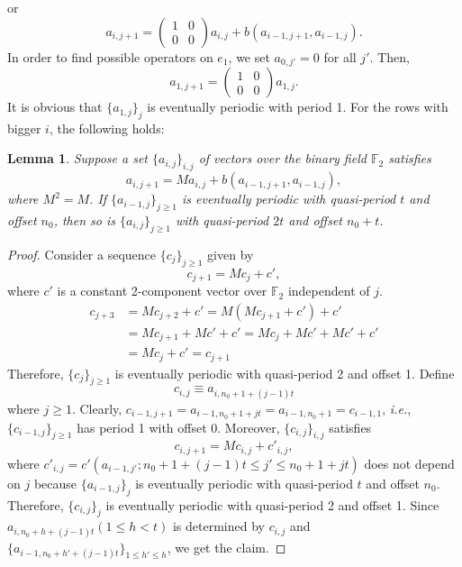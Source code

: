 \documentclass[letterpaper,10pt,pra,aps,showpacs,twocolumn]{revtex4-1}
\newtheorem{lem}{Lemma}
\theoremstyle{definition} \newtheorem{defn}{Definition}
\theoremstyle{definition} \newtheorem{remark}{Remark}
\newcommand{\ie}{\emph{i.e.}}
\begin{document}
or
\begin{equation}
 a_{i,j+1} = \begin{pmatrix} 1 & 0 \\ 0 & 0 \end{pmatrix} a_{i,j} + b( a_{i-1,j+1} , a_{i-1,j} ).
\label{eq:code-2-Rx-recursive}
\end{equation}
In order to find possible operators on $e_1$, we set $a_{0,j'}= 0$ for all $j'$. Then,
\[
 a_{1,j+1} = \begin{pmatrix} 1 & 0 \\ 0 & 0 \end{pmatrix} a_{1,j}.
\]
It is obvious that $\{ a_{1,j} \}_j$ is eventually periodic with period 1. For the rows with bigger $i$, the following holds:
\begin{lem}
Suppose a set $\{ a_{i,j} \}_{i,j}$ of vectors over the binary field $\mathbb{F}_2$ satisfies
\[
 a_{i,j+1} = M a_{i,j} + b( a_{i-1,j+1} , a_{i-1,j} ),
\]
where $M^2 = M$. If $\{ a_{i-1,j} \}_{j \geq 1}$ is eventually periodic with quasi-period $t$ and offset $n_0$, then so is $\{ a_{i,j} \}_{j \geq 1}$ with quasi-period $2t$ and offset $n_0 + t$.
\label{lem:doubling-quasi-period}
\end{lem}
\begin{proof}
Consider a sequence $\{ c_j \}_{j \geq 1}$ given by
\[
 c_{j+1} = M c_j + c' ,
\]
where $c'$ is a constant 2-component vector over $\mathbb{F}_2$ independent of $j$.
\begin{align*}
 c_{j+3}
&= M c_{j+2} + c' = M (M c_{j+1} +c') + c'\\
&= M c_{j+1} + M c' + c' = M c_j + M c' + M c' + c' \\
&= M c_j + c' = c_{j+1}
\end{align*}
Therefore, $\{ c_j \}_{j \geq 1}$ is eventually periodic with quasi-period 2 and offset 1.
Define
\[
 c_{i,j} \equiv a_{i, n_0+1+(j-1)t}
\]
where $j \geq 1$.
Clearly, $c_{i-1,j+1} = a_{i-1, n_0+1+jt} = a_{i-1,n_0+1} = c_{i-1,1}$, \ie, $\{ c_{i-1,j} \}_{j \geq 1} $ has period 1 with offset 0. Moreover, $\{ c_{i,j} \} _{i,j} $ satisfies
\[
 c_{i,j+1} = M c_{i,j} + c'_{i,j},
\]
where $c'_{i,j}=c'( a_{i-1,j'} ; n_0+1+(j-1)t \leq j' \leq n_0 + 1 + j t )$ does not depend on $j$ because $\{ a_{i-1,j} \}_j$ is eventually periodic with quasi-period $t$ and offset $n_0$. Therefore, $\{ c_{i,j} \}_j$ is eventually periodic with quasi-period 2 and offset 1. Since $a_{i,n_0+h+(j-1)t} (1 \leq h < t)$ is determined by $c_{i,j}$ and $\{ a_{i-1,n_0+h'+(j-1)t} \}_{1 \leq h' \leq h}$, we get the claim.
\end{proof}
\end{document}
